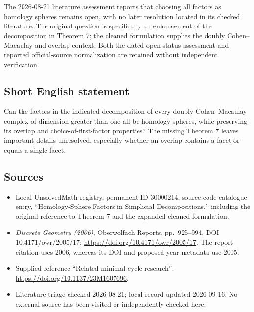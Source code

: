 \documentclass[11pt]{article}
\begin{document}
The 2026-08-21 literature assessment reports that choosing all factors as homology spheres remains open, with no later resolution located in its checked literature. The original question is specifically an enhancement of the decomposition in Theorem 7; the cleaned formulation supplies the doubly Cohen--Macaulay and overlap context. Both the dated open-status assessment and reported official-source normalization are retained without independent verification.
\subsection{Short English statement}
Can the factors in the indicated decomposition of every doubly Cohen--Macaulay complex of dimension greater than one all be homology spheres, while preserving its overlap and choice-of-first-factor properties? The missing Theorem 7 leaves important details unresolved, especially whether an overlap contains a facet or equals a single facet.
\subsection{Sources}
\begin{itemize}
\item Local UnsolvedMath registry, permanent ID 30000214, source code catalogue entry, ``Homology-Sphere Factors in Simplicial Decompositions,'' including the original reference to Theorem 7 and the expanded cleaned formulation.
\item \emph{Discrete Geometry (2006)}, Oberwolfach Reports, pp.\ 925--994, DOI 10.4171/owr/2005/17: \url{https://doi.org/10.4171/owr/2005/17}. The report citation uses 2006, whereas its DOI and proposed-year metadata use 2005.
\item Supplied reference ``Related minimal-cycle research'': \url{https://doi.org/10.1137/23M1607696}.
\item Literature triage checked 2026-08-21; local record updated 2026-09-16. No external source has been visited or independently checked here.
\end{itemize}
\end{document}
